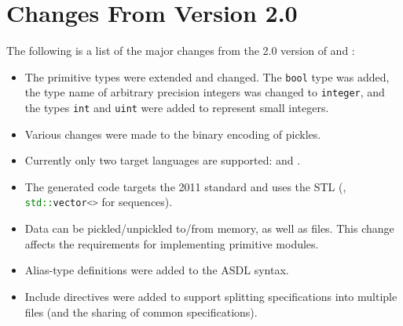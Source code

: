 \section{Changes From Version 2.0}
\label{sec:changes}

The following is a list of the major changes from the 2.0 version of \asdl{}
and \asdlgen{}:
\begin{itemize}
  \item
    The primitive types were extended and changed.
    The \lstinline!bool! type was added, the type name of arbitrary precision integers
    was changed to \lstinline!integer!, and the types \lstinline!int! and \lstinline!uint!
    were added to represent small integers.
  \item
    Various changes were made to the binary encoding of pickles.
  \item
    Currently only two target languages are supported: \sml{} and \Cplusplus{}.
  \item
    The generated \Cplusplus{} code targets the 2011 standard and uses the
    \Cplusplus{} STL (\eg{}, \lstinline[language=C++]!std::vector<>! for \asdl{} sequences).
  \item
    Data can be pickled/unpickled to/from memory, as well as files.
    This change affects the requirements for implementing primitive modules.
  \item
    Alias-type definitions were added to the ASDL syntax.
  \item
    Include directives were added to support splitting specifications into multiple
    files (and the sharing of common specifications).
\end{itemize}%
